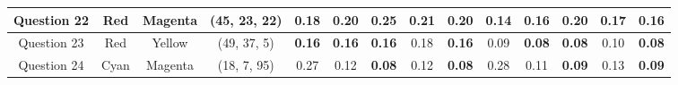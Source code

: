 \begin{table}[!htbp]
{\begin{tabular}{@{}cccccclccccclcccc@{}}
    \multicolumn{1}{c|}{Question 22} & \multicolumn{1}{c|}{Red}     & \multicolumn{1}{c|}{Magenta} & \multicolumn{2}{c||}{\cellcolor[HTML]{FF0080}(45, 23, 22)}                                                             & \multicolumn{2}{c|}{\cellcolor[HTML]{32CB00}\textbf{0.18}} & \multicolumn{1}{c|}{0.20}                                  & \multicolumn{1}{c|}{0.25}                                  & \multicolumn{1}{c|}{0.21}                                  & \multicolumn{1}{c||}{0.20}                                  & \multicolumn{2}{c|}{\cellcolor[HTML]{32CB00}\textbf{0.14}} & \multicolumn{1}{c|}{0.16}                                  & \multicolumn{1}{c|}{0.20}                                  & \multicolumn{1}{c|}{0.17}                                  & \multicolumn{1}{c|}{0.16}                                  \\ \midrule
    \multicolumn{1}{c|}{Question 23} & \multicolumn{1}{c|}{Red}     & \multicolumn{1}{c|}{Yellow}  & \multicolumn{2}{c||}{\cellcolor[HTML]{FF8000}(49, 37, 5)}                                                              & \multicolumn{2}{c|}{\cellcolor[HTML]{32CB00}\textbf{0.16}} & \multicolumn{1}{c|}{\cellcolor[HTML]{32CB00}\textbf{0.16}} & \multicolumn{1}{c|}{\cellcolor[HTML]{32CB00}\textbf{0.16}} & \multicolumn{1}{c|}{0.18}                                  & \multicolumn{1}{c||}{\cellcolor[HTML]{32CB00}\textbf{0.16}} & \multicolumn{2}{c|}{0.09}                                  & \multicolumn{1}{c|}{\cellcolor[HTML]{32CB00}\textbf{0.08}} & \multicolumn{1}{c|}{\cellcolor[HTML]{32CB00}\textbf{0.08}} & \multicolumn{1}{c|}{0.10}                                  & \multicolumn{1}{c|}{\cellcolor[HTML]{32CB00}\textbf{0.08}} \\ \midrule
    \multicolumn{1}{c|}{Question 24} & \multicolumn{1}{c|}{Cyan}    & \multicolumn{1}{c|}{Magenta} & \multicolumn{2}{c||}{\cellcolor[HTML]{0000FF}(18, 7, 95)}                                                              & \multicolumn{2}{c|}{0.27}                                  & \multicolumn{1}{c|}{0.12}                                  & \multicolumn{1}{c|}{\cellcolor[HTML]{32CB00}\textbf{0.08}} & \multicolumn{1}{c|}{0.12}                                  & \multicolumn{1}{c||}{\cellcolor[HTML]{32CB00}\textbf{0.08}} & \multicolumn{2}{c|}{0.28}                                  & \multicolumn{1}{c|}{0.11}                                  & \multicolumn{1}{c|}{\cellcolor[HTML]{32CB00}\textbf{0.09}} & \multicolumn{1}{c|}{0.13}                                  & \multicolumn{1}{c|}{\cellcolor[HTML]{32CB00}\textbf{0.09}} \\ \midrule

\end{tabular}}
\end{table}
